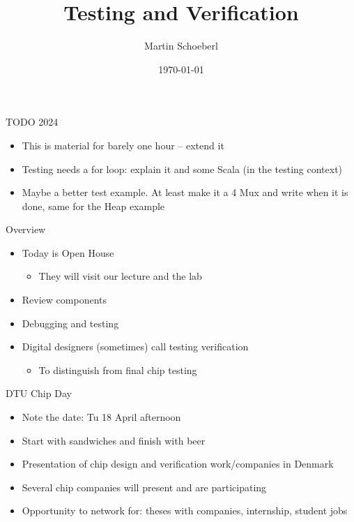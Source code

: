 

\newif\ifbook


\title{Testing and Verification}
\author{Martin Schoeberl}
\date{\today}



\begin{frame}
\titlepage
\end{frame}

\begin{frame}[fragile]{TODO 2024}
\begin{itemize}
\item This is material for barely one hour -- extend it
\item Testing needs a for loop: explain it and some Scala (in the testing context)
\item Maybe a better test example. At least make it a 4 Mux and write when it is done, same for the Heap example
\end{itemize}
\end{frame}

\begin{frame}[fragile]{Overview}
\begin{itemize}
\item Today is Open House
\begin{itemize}
\item They will visit our lecture and the lab
\end{itemize}
\item Review components
\item Debugging and testing
\item Digital designers (sometimes) call testing verification
\begin{itemize}
\item To distinguish from final chip testing
\end{itemize}
\end{itemize}
\end{frame}

\begin{frame}[fragile]{DTU Chip Day}
\begin{itemize}
\item Note the date: Tu 18 April afternoon
\item Start with sandwiches and finish with beer
\item Presentation of chip design and verification work/companies in Denmark
\item Several chip companies will present and are participating
\item Opportunity to network for: theses with companies, internship, student jobs
\end{itemize}
\end{frame}

